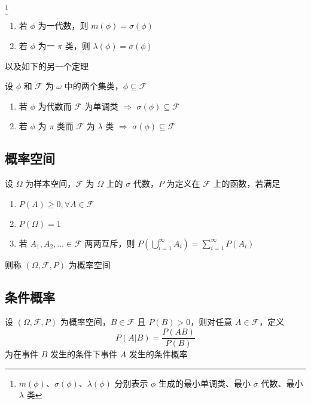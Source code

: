 \documentclass[12pt,a4paper]{amsart}
\begin{document}
\begin{proposition}[单调类定理]\footnote{$m(\phi)$、$\sigma(\phi)$、$\lambda(\phi)$ 分别表示 $\phi$ 生成的最小单调类、最小 $\sigma$ 代数、最小 $\lambda$ 类}
    \begin{enumerate}
        \item 若 $\phi$ 为一代数，则 $m(\phi) = \sigma(\phi)$
        \item 若 $\phi$ 为一 $\pi$ 类，则 $\lambda(\phi) = \sigma(\phi)$
    \end{enumerate}
\end{proposition}

以及如下的另一个定理

\begin{proposition}
    设 $\phi$ 和 $\mathcal{F}$ 为 $\omega$ 中的两个集类，$\phi\subseteq \mathcal{F}$
    \begin{enumerate}
        \item 若 $\phi$ 为代数而 $\mathcal{F}$ 为单调类 $\Rightarrow$ $\sigma(\phi)\subseteq\mathcal{F}$
        \item 若 $\phi$ 为 $\pi$ 类而 $\mathcal{F}$ 为 $\lambda$ 类 $\Rightarrow$ $\sigma(\phi)\subseteq\mathcal{F}$
    \end{enumerate}
\end{proposition}

\subsection{概率空间}

\begin{definition}[概率空间]
    设 $\Omega$ 为样本空间，$\mathcal{F}$ 为 $\Omega$ 上的 $\sigma$ 代数，$P$ 为定义在 $\mathcal{F}$ 上的函数，若满足
    \begin{enumerate}
        \item $P(A)\geq 0,\forall A\in\mathcal{F}$
        \item $P(\Omega) = 1$
        \item 若 $A_1,A_2,\ldots\in\mathcal{F}$ 两两互斥，则 $P(\bigcup_{i=1}^\infty A_i) = \sum_{i=1}^\infty P(A_i)$
    \end{enumerate}
    则称 $(\Omega,\mathcal{F},P)$ 为概率空间
\end{definition}

\subsection{条件概率}

\begin{definition}[条件概率]
    设 $(\Omega,\mathcal{F},P)$ 为概率空间，$B\in\mathcal{F}$ 且 $P(B)>0$，则对任意 $A\in\mathcal{F}$，定义
    \[ P(A|B) = \frac{P(AB)}{P(B)} \]
    为在事件 $B$ 发生的条件下事件 $A$ 发生的条件概率
\end{definition}
\end{document}

